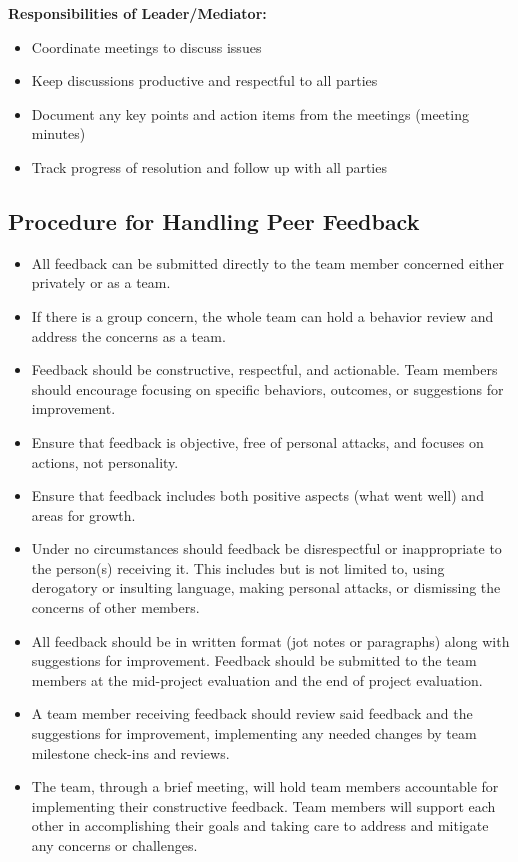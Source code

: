 \documentclass[titlepage]{article}
\begin{document}
\textbf{Responsibilities of Leader/Mediator:}
\begin{itemize}
  \item Coordinate meetings to discuss issues
  \item Keep discussions productive and respectful to all parties
  \item Document any key points and action items from the meetings
    (meeting minutes)
  \item Track progress of resolution and follow up with all parties
\end{itemize}

\subsection{Procedure for Handling Peer Feedback}
\begin{itemize}
  \item All feedback can be submitted directly to the team member
    concerned either privately or as a team.

  \item If there is a group concern, the whole team can hold a
    behavior review and
    address the concerns as a team.
  \item Feedback should be constructive, respectful, and actionable.
    Team members
    should encourage focusing on specific behaviors, outcomes, or
    suggestions for
    improvement.
  \item Ensure that feedback is objective, free of personal attacks,
    and focuses on
    actions, not personality.
  \item Ensure that feedback includes both positive aspects (what went well) and
    areas for growth.
  \item Under no circumstances should feedback be disrespectful or inappropriate
    to the person(s) receiving it. This includes but is not limited to, using
    derogatory or insulting language, making personal attacks, or dismissing the
    concerns of other members.
  \item All feedback should be in written format (jot notes or
    paragraphs) along with
    suggestions for improvement. Feedback should be submitted to the
    team members
    at the mid-project evaluation and the end of project evaluation.
  \item A team member receiving feedback should review said feedback and the
    suggestions for improvement, implementing any needed changes by team
    milestone check-ins and reviews.
  \item The team, through a brief meeting, will hold team members
    accountable for
    implementing their constructive feedback. Team members will
    support each other
    in accomplishing their goals and taking care to address and
    mitigate any concerns
    or challenges.
\end{itemize}
\end{document}

